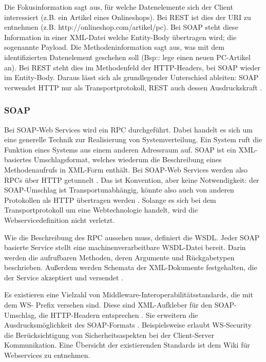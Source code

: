 \documentclass[12pt,a4paper,bibliography=totocnumbered,listof=totoc]{scrartcl}
\begin{document}
Die Fokusinformation sagt aus, für welche Datenelemente sich der Client interessiert (z.B. ein Artikel eines Onlineshops). Bei REST ist dies der URI zu entnehmen (z.B. http://onlineshop.com/artikel/pc). Bei SOAP steht diese Information in einer XML-Datei welche Entity-Body übertragen wird; die sogenannte Payload. Die Methodeninformation sagt aus, was mit dem identifizierten Datenelement geschehen soll (Bsp:: lege einen neuen PC-Artikel an). Bei REST steht dies im Methodenfeld der HTTP-Headers, bei SOAP wieder im Entity-Body. Daraus lässt sich als grundlegender Unterschied ableiten: SOAP verwendet HTTP nur als Transportprotokoll, REST auch dessen Ausdruckskraft \citep{wilde11}.

\subsubsection{SOAP}
Bei SOAP-Web Services wird ein \ac{RPC} durchgeführt. Dabei handelt es sich um eine generelle Technik zur Realisierung von Systemverteilung. Ein System ruft die Funktion eines Systems aus einem anderen Adressraum auf. SOAP ist ein XML-basiertes Umschlagsformat, welches wiederum die Beschreibung eines Methodenaufrufs in XML-Form enthält. Bei SOAP-Web Services werden also \ac{RPC}s über HTTP getunnelt \citep{wilde11}. Das ist Konvention, aber keine Notwendigkeit: der SOAP-Umschlag ist Transportunabhängig, könnte also auch von anderen Protokollen als HTTP übertragen werden \citep{tilkov11}. Solange es sich bei dem Transportprotokoll um eine Webtechnologie handelt, wird die Webservicedefinition nicht verletzt.

Wie die Beschreibung des \ac{RPC} aussehen muss, definiert die \ac{WSDL}. Jeder SOAP basierte Service stellt eine machinenverarbeitbare \ac{WSDL}-Datei bereit. Darin werden die aufrufbaren Methoden, deren Argumente und Rückgabetypen beschrieben. Außerdem werden Schemata der XML-Dokumente festgehalten, die der Service akzeptiert und versendet \citep{richardson07}.

Es existieren eine Vielzahl von Middleware-Interoperabilitätsstandards, die mit dem \glqq WS-\grqq{} Prefix versehen sind. Diese sind \glqq XML-Aufkleber\grqq{} für den SOAP-Umschlag, die HTTP-Headern entsprechen \citep{richardson07}. Sie erweitern die Ausdrucksmöglichkeit des SOAP-Formats \citep{wilde11}. Beispielsweise erlaubt WS-Security die Berücksichtigung von Sicherheitsaspekten bei der Client-Server Kommunikation. Eine Übersicht der existierenden Standards ist dem Wiki für Webservices \citet{webServiceWiki09} zu entnehmen.
\end{document}
